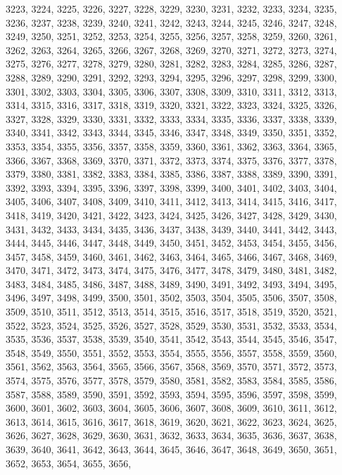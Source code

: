 3223,
3224,
3225,
3226,
3227,
3228,
3229,
3230,
3231,
3232,
3233,
3234,
3235,
3236,
3237,
3238,
3239,
3240,
3241,
3242,
3243,
3244,
3245,
3246,
3247,
3248,
3249,
3250,
3251,
3252,
3253,
3254,
3255,
3256,
3257,
3258,
3259,
3260,
3261,
3262,
3263,
3264,
3265,
3266,
3267,
3268,
3269,
3270,
3271,
3272,
3273,
3274,
3275,
3276,
3277,
3278,
3279,
3280,
3281,
3282,
3283,
3284,
3285,
3286,
3287,
3288,
3289,
3290,
3291,
3292,
3293,
3294,
3295,
3296,
3297,
3298,
3299,
3300,
3301,
3302,
3303,
3304,
3305,
3306,
3307,
3308,
3309,
3310,
3311,
3312,
3313,
3314,
3315,
3316,
3317,
3318,
3319,
3320,
3321,
3322,
3323,
3324,
3325,
3326,
3327,
3328,
3329,
3330,
3331,
3332,
3333,
3334,
3335,
3336,
3337,
3338,
3339,
3340,
3341,
3342,
3343,
3344,
3345,
3346,
3347,
3348,
3349,
3350,
3351,
3352,
3353,
3354,
3355,
3356,
3357,
3358,
3359,
3360,
3361,
3362,
3363,
3364,
3365,
3366,
3367,
3368,
3369,
3370,
3371,
3372,
3373,
3374,
3375,
3376,
3377,
3378,
3379,
3380,
3381,
3382,
3383,
3384,
3385,
3386,
3387,
3388,
3389,
3390,
3391,
3392,
3393,
3394,
3395,
3396,
3397,
3398,
3399,
3400,
3401,
3402,
3403,
3404,
3405,
3406,
3407,
3408,
3409,
3410,
3411,
3412,
3413,
3414,
3415,
3416,
3417,
3418,
3419,
3420,
3421,
3422,
3423,
3424,
3425,
3426,
3427,
3428,
3429,
3430,
3431,
3432,
3433,
3434,
3435,
3436,
3437,
3438,
3439,
3440,
3441,
3442,
3443,
3444,
3445,
3446,
3447,
3448,
3449,
3450,
3451,
3452,
3453,
3454,
3455,
3456,
3457,
3458,
3459,
3460,
3461,
3462,
3463,
3464,
3465,
3466,
3467,
3468,
3469,
3470,
3471,
3472,
3473,
3474,
3475,
3476,
3477,
3478,
3479,
3480,
3481,
3482,
3483,
3484,
3485,
3486,
3487,
3488,
3489,
3490,
3491,
3492,
3493,
3494,
3495,
3496,
3497,
3498,
3499,
3500,
3501,
3502,
3503,
3504,
3505,
3506,
3507,
3508,
3509,
3510,
3511,
3512,
3513,
3514,
3515,
3516,
3517,
3518,
3519,
3520,
3521,
3522,
3523,
3524,
3525,
3526,
3527,
3528,
3529,
3530,
3531,
3532,
3533,
3534,
3535,
3536,
3537,
3538,
3539,
3540,
3541,
3542,
3543,
3544,
3545,
3546,
3547,
3548,
3549,
3550,
3551,
3552,
3553,
3554,
3555,
3556,
3557,
3558,
3559,
3560,
3561,
3562,
3563,
3564,
3565,
3566,
3567,
3568,
3569,
3570,
3571,
3572,
3573,
3574,
3575,
3576,
3577,
3578,
3579,
3580,
3581,
3582,
3583,
3584,
3585,
3586,
3587,
3588,
3589,
3590,
3591,
3592,
3593,
3594,
3595,
3596,
3597,
3598,
3599,
3600,
3601,
3602,
3603,
3604,
3605,
3606,
3607,
3608,
3609,
3610,
3611,
3612,
3613,
3614,
3615,
3616,
3617,
3618,
3619,
3620,
3621,
3622,
3623,
3624,
3625,
3626,
3627,
3628,
3629,
3630,
3631,
3632,
3633,
3634,
3635,
3636,
3637,
3638,
3639,
3640,
3641,
3642,
3643,
3644,
3645,
3646,
3647,
3648,
3649,
3650,
3651,
3652,
3653,
3654,
3655,
3656,
